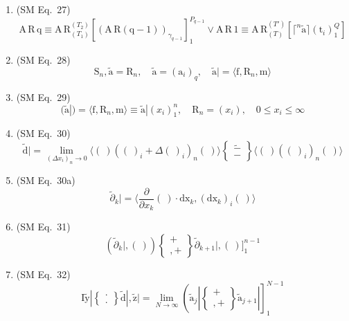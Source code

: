 \documentclass[12pt]{article}
\begin{document}
\begin{enumerate}[label=(\arabic*), series=formellist]
    \item (SM Eq.\ 27) 
    \[
    \mathrm{A}\,\mathrm{R}\,\mathrm{q} \equiv \mathrm{A}\,\mathrm{R}_{(T_1)}^{(T_2)} \left[ (\mathrm{A}\,\mathrm{R}(\mathrm{q}-1))_{\gamma_{q-1}} \right]_1^{P_{q-1}} \lor \mathrm{A}\,\mathrm{R}\,1 \equiv \mathrm{A}\,\mathrm{R}_{(T)}^{(T')} \left[ \lceil^n \tilde{\mathrm{a}} \rceil (\mathrm{t}_i)_1^Q \right]
    \]

    \item (SM Eq.\ 28) 
    \[
    \mathrm{S}_n, \tilde{\mathrm{a}} = \mathrm{R}_n, \quad \tilde{\mathrm{a}} = (\mathrm{a}_i)_q, \quad \tilde{\mathrm{a}}| = \langle \mathrm{f}, \mathrm{R}_n, \mathrm{m} \rangle
    \]

    \item (SM Eq.\ 29) 
    \[
    (\tilde{\mathrm{a}}|) = \langle \mathrm{f}, \mathrm{R}_n, \mathrm{m} \rangle \equiv \tilde{\mathrm{a}}| (x_i)_1^n, \quad \mathrm{R}_n = (x_i), \quad 0 \le x_i \le \infty
    \]

    \item (SM Eq.\ 30) 
    \[
    \tilde{\mathrm{d}}| = \lim_{(\Delta x_i)_n \to 0} \langle (\ ) \left( (\ )_i + \Delta (\ )_i \right)_n (\ ) \rangle \left\{ \begin{smallmatrix} \tilde{-} \\ - \end{smallmatrix} \right\} \langle (\ ) \left( (\ )_i \right)_n (\ ) \rangle
    \]

    \item (SM Eq.\ 30a) 
    \[
    \tilde{\partial}_k| = \langle \frac{\partial}{\partial x_k} (\ ) \cdot \mathrm{dx}_k, (\mathrm{dx}_k)_i (\ ) \rangle
    \]

    \item (SM Eq.\ 31) 
    \[
    \left( \tilde{\partial}_k |, (\ ) \right) \left\{ \begin{smallmatrix} + \\ ,+ \end{smallmatrix} \right\} \tilde{\partial}_{k+1} |, (\ ) \bigr]_1^{n-1}
    \]

    \item (SM Eq.\ 32) 
    \[
    \mathrm{I} \tilde{\mathrm{y}}| \left\{ \begin{smallmatrix} \cdot \\ . \end{smallmatrix} \right\} \tilde{\mathrm{d}}|, \tilde{\mathrm{z}}| = \lim_{N \to \infty} \left( \tilde{\mathrm{a}}_j| \left\{ \begin{smallmatrix} + \\ ,+ \end{smallmatrix} \right\} \tilde{\mathrm{a}}_{j+1}| \right]_1^{N-1}
    \]


\end{enumerate}
\end{document}
